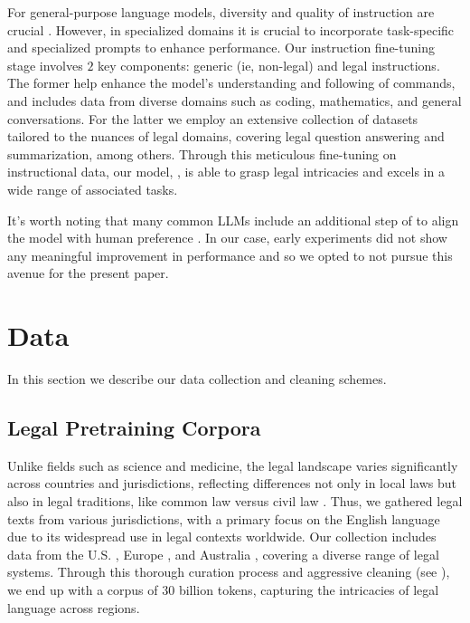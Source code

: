 For general-purpose language models, diversity and quality of instruction are crucial \cite{cao2023instruction,zhou2023lima}. However, in specialized domains it is crucial to incorporate task-specific and specialized prompts to enhance performance. Our instruction fine-tuning stage involves $2$ key components: generic (ie, non-legal) and legal instructions. The former help enhance the model's understanding and following of commands, and includes data from diverse domains such as coding, mathematics, and general conversations. For the latter we employ an extensive collection of datasets tailored to the nuances of legal domains, covering legal question answering and summarization, among others.
Through this meticulous fine-tuning on instructional data, our model, \ourmodelift{}, is able to grasp legal intricacies and excels in a wide range of associated tasks.

\begin{remark}
It's worth noting that many common LLMs \cite{tunstall2023zephyr} include an additional step of to align the model with human preference \cite{rafailov2023direct,munos2023nash,vonwerra2022trl}. In our case, early experiments did not show any meaningful improvement in performance and so we opted to not pursue this avenue for the present paper.
\end{remark}

\section{Data}
In this section we describe our data collection and cleaning schemes.

\subsection{Legal Pretraining Corpora}
Unlike fields such as science and medicine, the legal landscape varies significantly across countries and jurisdictions, reflecting differences not only in local laws but also in legal traditions, like common law versus civil law \cite{henderson2022pile}. Thus, we gathered legal texts from various jurisdictions, with a primary focus on the English language due to its widespread use in legal contexts worldwide. Our collection includes data from the U.S. \cite{tuggener2020ledgar}, Europe \cite{chalkidis2019neural}, and Australia \cite{butler-2023-open-australian-legal-corpus}, covering a diverse range of legal systems. Through this thorough curation process and aggressive cleaning (see ), we end up with a corpus of 30 billion tokens, capturing the intricacies of legal language across regions.%

